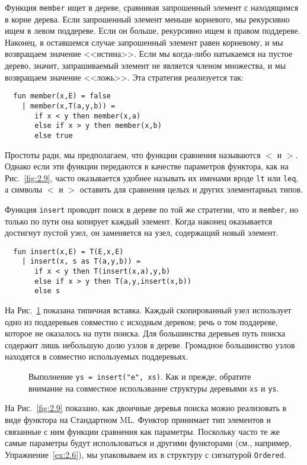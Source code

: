 Функция \lstinline!member! ищет в дереве, сравнивая запрошенный
элемент с находящимся в корне дерева. Если запрошенный элемент меньше
корневого, мы рекурсивно ищем в левом поддереве. Если он больше,
рекурсивно ищем в правом поддереве. Наконец, в оставшемся случае
запрошенный элемент равен корневому, и мы возвращаем значение
<<истина>>. Если мы когда-либо натыкаемся на пустое дерево, значит,
запрашиваемый элемент не является членом множества, и мы возвращаем
значение <<ложь>>.  Эта стратегия реализуется так:
\begin{lstlisting}
  fun member(x,E) = false
    | member(x,T(a,y,b)) =
       if x < y then member(x,a)
       else if x > y then member(x,b)
       else true
\end{lstlisting}
\begin{remark}
  Простоты ради, мы предполагаем, что функции сравнения называются $<$
  и $>$. Однако если эти функции передаются в качестве параметров
  функтора, как на Рис.~\ref{fig:2.9}, часто оказывается удобнее
  называть их именами вроде \lstinline!lt! или \lstinline!leq!, а
  символы $<$ и $>$ оставить для сравнения целых и других элементарных
  типов.
\end{remark}

Функция \lstinline!insert! проводит поиск в дереве по той же стратегии,
что и \lstinline!member!, но только по пути она копирует каждый
элемент. Когда наконец оказывается достигнут пустой узел, он
заменяется на узел, содержащий новый элемент.
\begin{lstlisting}
  fun insert(x,E) = T(E,x,E)
    | insert(x, s as T(a,y,b)) =
       if x < y then T(insert(x,a),y,b)
       else if x > y then T(a,y,insert(x,b))
       else s
\end{lstlisting}
На Рис.~\ref{fig:2.8} показана типичная вставка. Каждый скопированный
узел использует одно из поддеревьев совместно с исходным деревом; речь о том поддереве,
которое не оказалось на пути поиска. Для большинства деревьев путь
поиска содержит лишь небольшую долю узлов в дереве. Громадное
большинство узлов находятся в совместно используемых поддеревьях.

\begin{figure}
  \centering

  \caption{Выполнение \lstinline!ys = insert("e", xs)!. Как и прежде,
    обратите внимание на совместное использвание структуры деревьями \lstinline!xs! и \lstinline!ys!.}
  \label{fig:2.8}
\end{figure}

На Рис.~\ref{fig:2.9} показано, как двоичные деревья поиска можно
реализовать в виде функтора на Стандартном ML. Функтор принимает тип
элементов и связанные с ним функции сравнения как параметры. Поскольку
часто те же самые параметры будут использоваться и другими функторами
(см., например, Упражнение~\ref{ex:2.6}), мы упаковываем их в
структуру с сигнатурой \lstinline!Ordered!.

